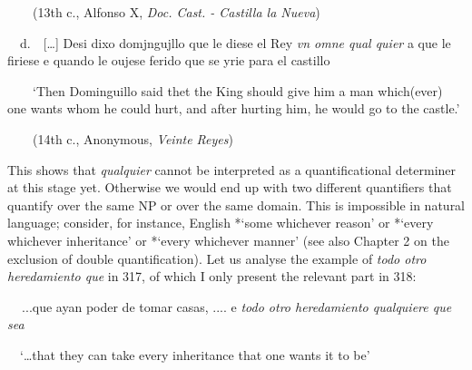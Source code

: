 \begin{styleStandard}
\ \ \ \ (13th c., Alfonso X, \textit{Doc. Cast. - Castilla la Nueva})
\end{styleStandard}

\begin{styleStandard}
\ \ d.\ \ […] Desi dixo domjngujllo que le diese el Rey \textit{vn omne qual quier} a que le firiese e quando le oujese ferido que se yrie para el castillo 
\end{styleStandard}

\begin{styleStandard}
\ \ \ \ ‘Then Dominguillo said thet the King should give him a man which(ever) one wants whom he could hurt, and after hurting him, he would go to the castle.’
\end{styleStandard}

\begin{styleStandard}
\ \ \ \ (14th c., Anonymous, \textit{Veinte Reyes})
\end{styleStandard}

\begin{styleStandard}
This shows that \textit{qualquier} cannot be interpreted as a quantificational determiner at this stage yet. Otherwise we would end up with two different quantifiers that quantify over the same NP or over the same domain. This is impossible in natural language; consider, for instance, English *‘some whichever reason’ or *‘every whichever inheritance’ or *‘every whichever manner’ (see also Chapter 2 on the exclusion of double quantification). Let us analyse the example of \textit{todo otro heredamiento que} in 317, of which I only present the relevant part in 318:
\end{styleStandard}

\begin{styleStandard}
\textbf{\ \ }...que ayan poder de tomar casas, .... e \textit{todo otro heredamiento qualquiere que sea}
\end{styleStandard}

\begin{styleStandard}
\ \ ‘…that they can take every inheritance that one wants it to be’ 
\end{styleStandard}

